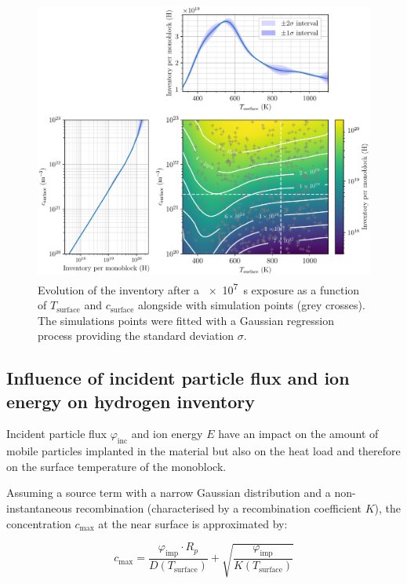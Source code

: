 \begin{figure} [h]
    \centering
    \includegraphics[width=\linewidth]{Figures/Chapter3/monoblocks/parametric_study/inventory_T_c_profiles.pdf}
    \caption{Evolution of the inventory after a \SI{e7}{s} exposure as a function of $T_\mathrm{surface}$ and $c_\mathrm{surface}$ alongside with simulation points (grey crosses). The simulations points were fitted with a Gaussian regression process \cite{chris_bowman_c-bowmaninference-tools_2020} providing the standard deviation $\sigma$.}
    \label{fig:inventory T c}
\end{figure}

\subsection{Influence of incident particle flux and ion energy on hydrogen inventory} \label{particle and energy}
Incident particle flux $\varphi_\mathrm{inc}$ and ion energy $E$ have an impact on the amount of mobile particles implanted in the material but also on the heat load and therefore on the surface temperature of the monoblock.

Assuming a source term with a narrow Gaussian distribution and a non-instantaneous recombination (characterised by a recombination coefficient $K$), the concentration $c_\mathrm{max}$ at the near surface is approximated by:

\begin{equation}
    c_\mathrm{max} =  \frac{\varphi_\mathrm{imp} \cdot R_p}{D(T_\mathrm{surface})} + \sqrt{\frac{\varphi_\mathrm{imp}}{K(T_\mathrm{surface})}}
    \label{eq:cmax}
\end{equation}

